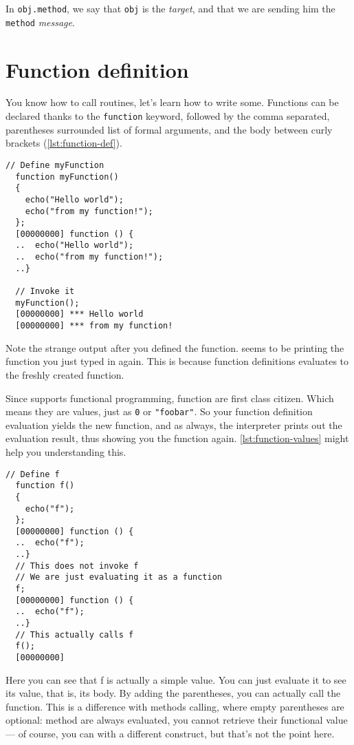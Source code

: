 \documentclass[openright,twoside,12pt]{report}
\begin{document}
In \lstinline|obj.method|, we say that \texttt{obj} is the {\em
  target}, and that we are sending him the \texttt{method} {\em
  message}.

\section{Function definition}

You know how to call routines, let's learn how to write
some. Functions can be declared thanks to the \texttt{function}
keyword, followed by the comma separated, parentheses surrounded list
of formal arguments, and the body between curly brackets (\autoref{lst:function-def}).

\begin{lstlisting}[caption=Defining a function,label=lst:function-def]
  // Define myFunction
  function myFunction()
  {
    echo("Hello world");
    echo("from my function!");
  };
  [00000000] function () {
  ..  echo("Hello world");
  ..  echo("from my function!");
  ..}

  // Invoke it
  myFunction();
  [00000000] *** Hello world
  [00000000] *** from my function!
\end{lstlisting}

Note the strange output after you defined the function. \urbi seems to
be printing the function you just typed in again. This is because
function definitions evaluates to the freshly created function.

Since \urbi supports functional programming, function are first class
citizen. Which means they are values, just as \texttt{0} or
\texttt{"foobar"}. So your function definition evaluation yields the
new function, and as always, the interpreter prints out the evaluation
result, thus showing you the function again. \autoref{lst:function-values}
might help you understanding this.


\begin{lstlisting}[caption=Function as values,label=lst:function-values]
  // Define f
  function f()
  {
    echo("f");
  };
  [00000000] function () {
  ..  echo("f");
  ..}
  // This does not invoke f
  // We are just evaluating it as a function
  f;
  [00000000] function () {
  ..  echo("f");
  ..}
  // This actually calls f
  f();
  [00000000]
\end{lstlisting}

Here you can see that f is actually a simple value. You can just
evaluate it to see its value, that is, its body. By adding the
parentheses, you can actually call the function. This is a difference
with methods calling, where empty parentheses are optional: method are
always evaluated, you cannot retrieve their functional value --- of
course, you can with a different construct, but that's not the point
here.
\end{document}
